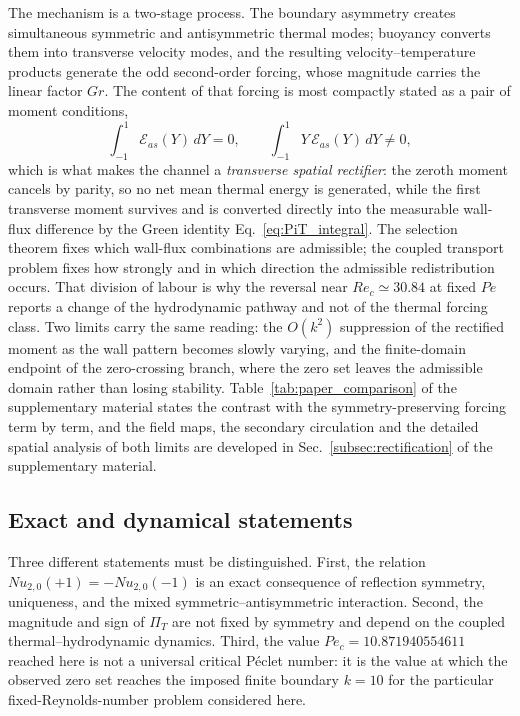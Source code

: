 \documentclass[12pt,a4paper]{article}
\newcommand{\Rey}{\mathit{Re}}
\newcommand{\Pe}{\mathit{Pe}}
\newcommand{\Grr}{\mathit{Gr}}
\newcommand{\Nu}{\mathit{Nu}}
\newcommand{\PiT}{\Pi_T}
\begin{document}
The mechanism is a two-stage process. The boundary asymmetry creates simultaneous
symmetric and antisymmetric thermal modes; buoyancy converts them into transverse
velocity modes, and the resulting velocity--temperature products generate the odd
second-order forcing, whose magnitude carries the linear factor $\Grr$. The content
of that forcing is most compactly stated as a pair of moment conditions,
\begin{equation}
  \int_{-1}^{1}\mathcal{E}_{as}(Y)\,dY=0,
  \qquad
  \int_{-1}^{1}Y\,\mathcal{E}_{as}(Y)\,dY\neq0,
  \label{eq:moment_pair}
\end{equation}
which is what makes the channel a \emph{transverse spatial rectifier}: the zeroth
moment cancels by parity, so no net mean thermal energy is generated, while the first
transverse moment survives and is converted directly into the measurable wall-flux
difference by the Green identity Eq.~\eqref{eq:PiT_integral}. The selection theorem
fixes which wall-flux combinations are admissible; the coupled transport problem fixes
how strongly and in which direction the admissible redistribution occurs. That
division of labour is why the reversal near $\Rey_c\simeq30.84$ at fixed $\Pe$
reports a change of the hydrodynamic pathway and not of the thermal forcing class.
Two limits carry the same reading: the $O(k^{2})$ suppression of the rectified moment
as the wall pattern becomes slowly varying, and the finite-domain endpoint of the
zero-crossing branch, where the zero set leaves the admissible domain rather than
losing stability. Table~\ref{tab:paper_comparison} of the supplementary material
states the contrast with the symmetry-preserving forcing term by term, and the
field maps, the secondary circulation and the detailed spatial analysis of both
limits are developed in
Sec.~\ref{subsec:rectification} of the supplementary material.

\subsection{Exact and dynamical statements}

Three different statements must be distinguished. First, the relation
$\Nu_{2,0}(+1)=-\Nu_{2,0}(-1)$ is an exact consequence of reflection symmetry,
uniqueness, and the mixed symmetric--antisymmetric interaction. Second, the
magnitude and sign of $\PiT$ are not fixed by symmetry and depend on the
coupled thermal--hydrodynamic dynamics. Third, the value
$\Pe_c=10.871940554611$ reached here is not a universal critical P\'eclet
number: it is
the value at which the observed zero set reaches the imposed finite boundary
$k=10$ for the particular fixed-Reynolds-number problem considered here.
\end{document}
